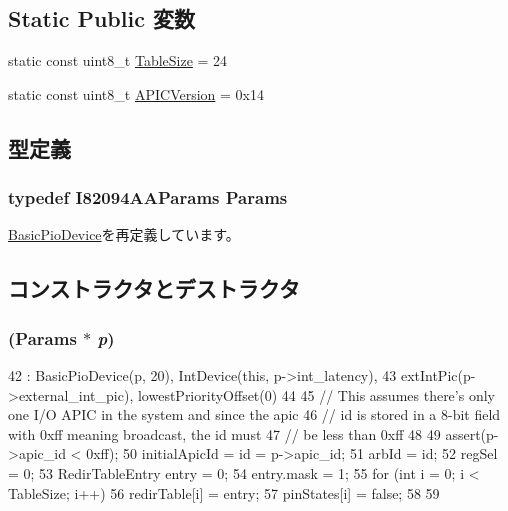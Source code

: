 \subsection*{Static Public 変数}
\begin{DoxyCompactItemize}
\item 
static const uint8\_\-t \hyperlink{classX86ISA_1_1I82094AA_a7556b7f499a21a1415a7ed642e8a9f9b}{TableSize} = 24
\item 
static const uint8\_\-t \hyperlink{classX86ISA_1_1I82094AA_a437efc43f76d70132c38495623562007}{APICVersion} = 0x14
\end{DoxyCompactItemize}


\subsection{型定義}
\hypertarget{classX86ISA_1_1I82094AA_ab98883343dbcbe45660e9b16b61507ad}{
\subsubsection[{Params}]{\setlength{\rightskip}{0pt plus 5cm}typedef I82094AAParams {\bf Params}}}
\label{classX86ISA_1_1I82094AA_ab98883343dbcbe45660e9b16b61507ad}


\hyperlink{classBasicPioDevice_a2845515ac6467f10540747053c8a0449}{BasicPioDevice}を再定義しています。

\subsection{コンストラクタとデストラクタ}
\hypertarget{classX86ISA_1_1I82094AA_a65401d9d5f73fed0b27a6c9aa13f0ded}{
\subsubsection[{I82094AA}]{ ({\bf Params} $\ast$ {\em p})}}
\label{classX86ISA_1_1I82094AA_a65401d9d5f73fed0b27a6c9aa13f0ded}



\begin{DoxyCode}
42     : BasicPioDevice(p, 20), IntDevice(this, p->int_latency),
43       extIntPic(p->external_int_pic), lowestPriorityOffset(0)
44 {
45     // This assumes there's only one I/O APIC in the system and since the apic
46     // id is stored in a 8-bit field with 0xff meaning broadcast, the id must
47     // be less than 0xff
48 
49     assert(p->apic_id < 0xff);
50     initialApicId = id = p->apic_id;
51     arbId = id;
52     regSel = 0;
53     RedirTableEntry entry = 0;
54     entry.mask = 1;
55     for (int i = 0; i < TableSize; i++) {
56         redirTable[i] = entry;
57         pinStates[i] = false;
58     }
59 }
\end{DoxyCode}


